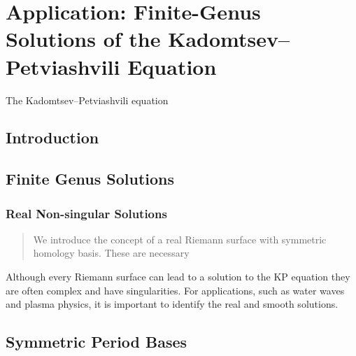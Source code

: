 \chapter{Application: Finite-Genus Solutions of the Kadomtsev--Petviashvili
  Equation}\label{ch:kp}

The Kadomtsev--Petviashvili equation

\section{Introduction}\label{sec:kp-introduction}



\section{Finite Genus Solutions}\label{sec:kp-finite-genus-solutions}

\subsection{Real Non-singular Solutions}

\begin{quote}
  We introduce the concept of a real Riemann surface with symmetric homology
  basis. These are necessary
\end{quote}


Although every Riemann surface can lead to a solution to the KP equation they
are often complex and have singularities. For applications, such as water waves
and plasma physics, it is important to identify the real and smooth solutions.

\section{Symmetric Period Bases}\label{sec:kp-symmetric-period-bases}

